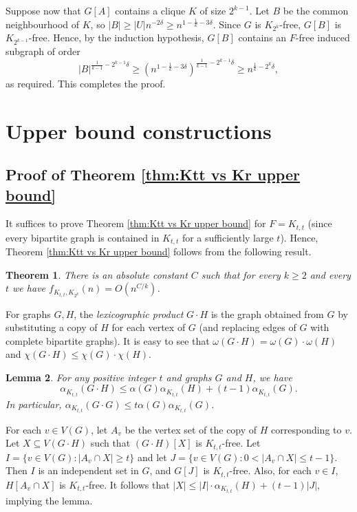\documentclass[11pt]{article}
\let\oldendproof\endproof
\renewenvironment{proof}[1][\proofname]{\oldproof[\bf #1]}{\oldendproof}
\theoremstyle{plain}
\newtheorem{theorem}{Theorem}[section]
\newtheorem{lemma}[theorem]{Lemma}
\theoremstyle{definition}
\begin{document}
\begin{proof}[Proof of Theorem \ref{thm:clique vs Ktt}]
		Suppose now that $G[A]$ contains a clique $K$ of size $2^{k-1}$. Let $B$ be the common neighbourhood of $K$, so $|B| \geq |U| n^{-2\delta} \geq 
		n^{1 - \frac{1}{k} - 3\delta}$. Since $G$ is $K_{2^k}$-free, $G[B]$ is $K_{2^{k-1}}$-free. Hence, by the induction hypothesis, $G[B]$ contains an $F$-free induced subgraph of order
		$$
		|B|^{\frac{1}{k-1} - 2^{k-1}\delta} \geq 
		\left( n^{1 - \frac{1}{k} - 3\delta} \right)^{\frac{1}{k-1} - 2^{k-1}\delta} \geq 
        n^{\frac{1}{k} - 2^k\delta},
		$$ 
		as required. This completes the proof. 
	\end{proof}



 

\section{Upper bound constructions} \label{sec:construction}

\subsection{Proof of Theorem \ref{thm:Ktt vs Kr upper bound}}
It suffices to prove Theorem \ref{thm:Ktt vs Kr upper bound} for $F = K_{t,t}$ (since every bipartite graph is contained in $K_{t,t}$ for a sufficiently large $t$). Hence, Theorem \ref{thm:Ktt vs Kr upper bound} follows from the following result.

 \begin{theorem}\label{thm:Ktt vs Kr construction}
     There is an absolute constant $C$ such that for every $k\geq 2$ and every $t$ we have $f_{K_{t,t},K_{2^k}}(n)=O(n^{C/k})$.
 \end{theorem}

     
	For graphs $G,H$, the {\em lexicographic product} $G \cdot H$ is the graph obtained from $G$ by substituting a copy of $H$ for each vertex of $G$ (and replacing edges of $G$ with complete bipartite graphs). It is easy to see that $\omega(G \cdot H) = \omega(G) \cdot \omega(H)$ and $\chi(G \cdot H) \leq \chi(G) \cdot \chi(H)$.
	\begin{lemma}\label{lem:substitution 2 graphs}
		For any positive integer $t$ and graphs $G$ and $H$, we have 
        $$\alpha_{K_{t,t}}(G \cdot H) \leq \alpha(G)\alpha_{K_{t,t}}(H) + (t-1)\alpha_{K_{t,t}}(G).$$ 
        In particular, $\alpha_{K_{t,t}}(G\cdot G)\leq t\alpha(G)\alpha_{K_{t,t}}(G)$.
	\end{lemma}
	\begin{proof}
		For each $v \in V(G)$, let $A_v$ be the vertex set of the copy of $H$ corresponding to $v$. Let $X \subseteq V(G\cdot H)$ such that $(G\cdot H)[X]$ is $K_{t,t}$-free. 
		Let $I = \{v\in V(G) : |A_v \cap X| \geq t\}$ and let $J = \{v\in V(G) : 0 < |A_v \cap X| \leq t-1\}$. Then $I$ is an independent set in $G$, and $G[J]$ is $K_{t,t}$-free. Also, for each $v \in I$, $H[A_v \cap X]$ is $K_{t,t}$-free. It follows that 
		$|X| \leq |I| \cdot \alpha_{K_{t,t}}(H) + (t-1)|J|$, implying the lemma. 
	\end{proof}
	\noindent
\end{document}
